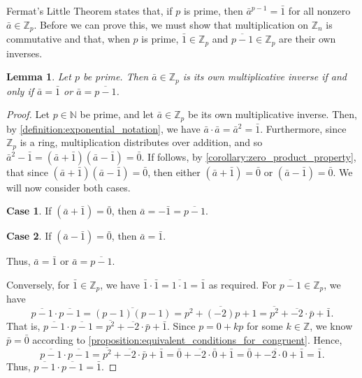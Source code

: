 \documentclass[10pt, titlepage]{amsart}
\newcommand\Z{{\mathbb Z}}
\newcommand\N{{\mathbb N}}
\newtheorem{theorem}{Theorem}[subsection]
\newtheorem{lemma}{Lemma}[subsection]
\theoremstyle{definition}
\begin{document}
	Fermat's Little Theorem states that, if $p$ is prime, then $\bar{a}^{p-1} = \bar{1}$ for all nonzero $\bar{a} \in \Z_p$. Before we can prove this, we must show that multiplication on $\Z_n$ is commutative and that, when $p$ is prime, $\bar{1} \in \Z_p$ and $\overline{p-1} \in \Z_p$ are their own inverses. 
	
	

	
	\begin{lemma}\label{lemma:1_and_p-1_own_inverses}
		Let $p$ be prime. Then $\bar{a} \in \Z_p$ is its own multiplicative inverse if and only if $\bar{a} = \bar{1}$ or $\bar{a} = \overline{p-1}$.
	\end{lemma}
	
	\begin{proof}
		Let $p \in \N$ be prime, and let $\bar{a} \in \Z_p$ be its own multiplicative inverse.
		Then, by \cref{definition:exponential_notation}, we have $\bar{a} \cdot \bar{a} = \bar{a}^2 = \bar{1}$.
		Furthermore, since $\Z_p$ is a ring, multiplication distributes over addition, and so $\bar{a}^2 - \bar{1} = (\bar{a} + \bar{1})(\bar{a} - \bar{1}) = \bar{0}$. 
		If follows, by \cref{corollary:zero_product_property}, that since $(\bar{a} + \bar{1})(\bar{a} - \bar{1}) = \bar{0}$, then either $(\bar{a} + \bar{1}) = \bar{0}$ or $(\bar{a} - \bar{1}) = \bar{0}$. 
		We will now consider both cases.
		
		\textbf{Case 1}. If $(\bar{a} + \bar{1}) = \bar{0}$, then $\bar{a} = -\bar{1} = \overline{p-1}$.
		
		\textbf{Case 2}. If $(\bar{a} - \bar{1}) = \bar{0}$, then $\bar{a} = \bar{1}$.
		
		\noindent Thus, $\bar{a} = \bar{1}$ or $\bar{a} = \overline{p-1}$.
		
		Conversely, for $\bar{1} \in \Z_p$, we have $\bar{1} \cdot \bar{1} = \overline{1 \cdot 1}= \bar{1}$ as required.
		For $\overline{p-1} \in \Z_p$, we have $$\overline{p-1} \cdot \overline{p-1} = \overline{(p-1)(p-1)} = \overline{p^2 + (-2)p + 1} = \overline{p^2} + \overline{-2} \cdot \bar{p} + \bar{1}.$$
		That is, $\overline{p-1} \cdot \overline{p-1} =  \overline{p^2} + \overline{-2} \cdot \bar{p} + \bar{1}.$
		Since $p = 0 + kp$ for some $k \in \Z$, we know $\bar{p} = \bar{0}$ according to \cref{proposition:equivalent_conditions_for_congruent}. 
		Hence, 
		$$\overline{p-1} \cdot \overline{p-1} = \overline{p^2} + \overline{-2} \cdot \bar{p} + \bar{1} = \bar{0} + \overline{-2} \cdot \bar{0} + \bar{1} = \bar{0} + \overline{-2 \cdot 0} + \bar{1} = \bar{1}.$$
		Thus, $\overline{p-1} \cdot \overline{p-1} = \bar{1}.$  
	\end{proof}
	
\end{document}
